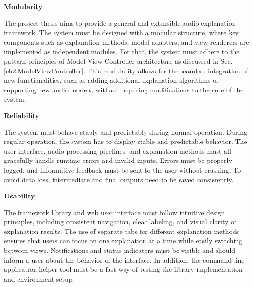 \documentclass[
    bindingoffset=5mm,  %
    footnoteindent=3mm, %
    hyphenation=true    %
]{src/wut-thesis}
\begin{document}
\begin{description}
    \item \textbf{Modularity}

         The project thesis aims to provide a general and extensible audio explanation framework. The system must be 
    designed with a modular structure, where key components such as explanation methods, model adapters, and view
    renderers are implemented as independent modules. For that, the system must adhere 
    to the pattern principles of Model-View-Controller architecture as discussed
    in Sec. \ref{ch2:ModelViewController}. This modularity allows for the seamless integration of new 
    functionalities, such as adding additional explanation algorithms or
    supporting new audio models, without requiring  modifications to the core of the system.

    \item \textbf{Reliability}

        The system must behave stably and predictably during normal operation. During regular operation, the system has to
    display stable and predictable behavior. The user interface, audio processing pipelines, and explanation methods must
    all gracefully handle runtime errors and invalid inputs. Errors must be properly logged, and informative feedback must
    be sent to the user without crashing. To avoid data loss, intermediate and final outputs need to be saved consistently.

    \item \textbf{Usability}

        The framework library and web user interface must follow intuitive design principles, including consistent
    navigation, clear labeling, and visual clarity of explanation results. The use of separate tabs for different 
    explanation methods ensures that users can focus on one explanation at a time while easily switching between views. 
    Notifications and status indicators must be visible and should inform a user about the behavior of the interface. In 
    addition, the command-line application helper tool must be a fast way of testing the library implementation and environment setup.

\end{description}
\end{document}
